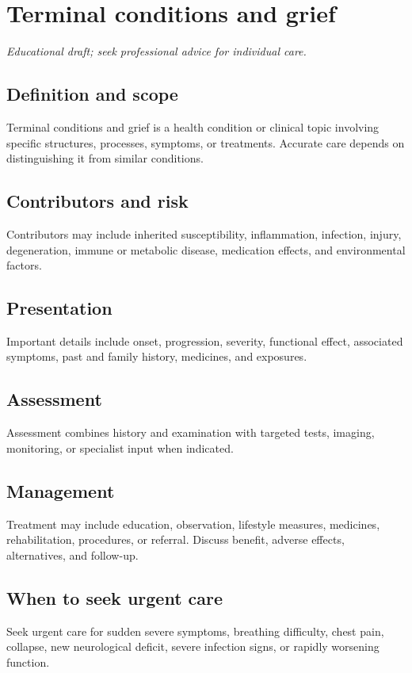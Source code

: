 \chapter{Terminal conditions and grief}
\medskip
\noindent\textit{Educational draft; seek professional advice for individual care.}

\section*{Definition and scope}
Terminal conditions and grief is a health condition or clinical topic involving specific structures, processes, symptoms, or treatments. Accurate care depends on distinguishing it from similar conditions.

\section*{Contributors and risk}
Contributors may include inherited susceptibility, inflammation, infection, injury, degeneration, immune or metabolic disease, medication effects, and environmental factors.

\section*{Presentation}
Important details include onset, progression, severity, functional effect, associated symptoms, past and family history, medicines, and exposures.

\section*{Assessment}
Assessment combines history and examination with targeted tests, imaging, monitoring, or specialist input when indicated.

\section*{Management}
Treatment may include education, observation, lifestyle measures, medicines, rehabilitation, procedures, or referral. Discuss benefit, adverse effects, alternatives, and follow-up.

\section*{When to seek urgent care}
Seek urgent care for sudden severe symptoms, breathing difficulty, chest pain, collapse, new neurological deficit, severe infection signs, or rapidly worsening function.

